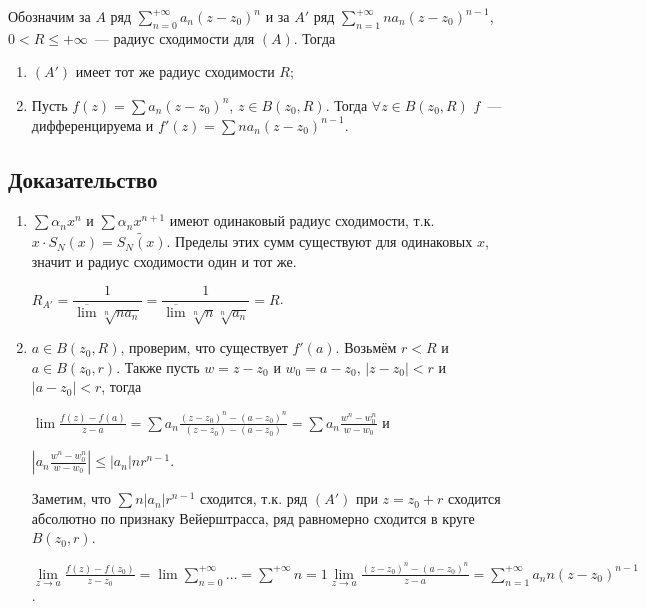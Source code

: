 \documentclass{article}
\begin{document}
        Обозначим за $A$ ряд $\sum\limits^{+\infty}_{n = 0} a_n (z - z_0)^n$ и за $A'$ ряд $\sum\limits^{+\infty}_{n = 1} n a_n (z - z_0)^{n - 1}$, $0 < R \leq +\infty$~--- радиус сходимости для $(A)$. Тогда
        
        \begin{enumerate}
        
            \item $(A')$ имеет тот же радиус сходимости $R$;
            
            \item Пусть $f(z) = \sum a_n (z - z_0)^n$, $z \in B(z_0, R)$. Тогда $\forall z \in B(z_0, R)$ $f$~--- дифференцируема и $f'(z) = \sum n a_n (z - z_0)^{n - 1}$.
            
        \end{enumerate}
        
        \subsection{Доказательство}
        
            \begin{enumerate}
            
                \item $\sum \alpha_n x^n$ и $\sum \alpha_n x^{n + 1}$ имеют одинаковый радиус сходимости, т.к. $x \cdot S_N(x) = \widetilde{S_N(x)}$. Пределы этих сумм существуют для одинаковых $x$, значит и радиус сходимости один и тот же.
                
                    $R_{A'} = \dfrac{1}{\overline{\lim}\sqrt[n]{n a_n}} = \dfrac{1}{\overline{\lim}\sqrt[n]{n}\sqrt[n]{a_n}} = R$.
                    
                \item $a \in B(z_0, R)$, проверим, что существует $f'(a)$. Возьмём $r < R$ и $a \in B(z_0, r)$. Также пусть $w = z - z_0$ и $w_0 = a - z_0$, $| z - z_0 | < r$ и $| a - z_0 | < r$, тогда
                
                    $\lim \frac{f(z) - f(a)}{z - a} = \sum a_n \frac{(z - z_0)^n - (a - z_0)^n}{(z - z_0) - (a - z_0)} = \sum a_n \frac{w^n - w_0^n}{w - w_0}$ и 
                    
                    $\left| a_n \frac{w^n - w_0^n}{w - w_0} \right| \leq | a_n | n r^{n - 1}$.
                    
                    Заметим, что $\sum n | a_n | r^{n - 1}$ сходится, т.к. ряд $(A')$ при $z = z_0 + r$ сходится абсолютно по признаку Вейерштрасса, ряд равномерно сходится в круге $B(z_0, r)$.
                    
                    $\lim\limits_{z \rightarrow a} \frac{f(z) - f(z_0)}{z - z_0} = \lim \sum\limits^{+\infty}_{n = 0} \ldots = \sum\limits^{+\infty}{n = 1} \lim\limits_{z \rightarrow a} \frac{(z - z_0)^n - (a - z_0)^n}{z - a} = \sum\limits^{+\infty}_{n = 1} a_n n (z - z_0)^{n - 1}$.
                    
            \end{enumerate}
            
\end{document}
